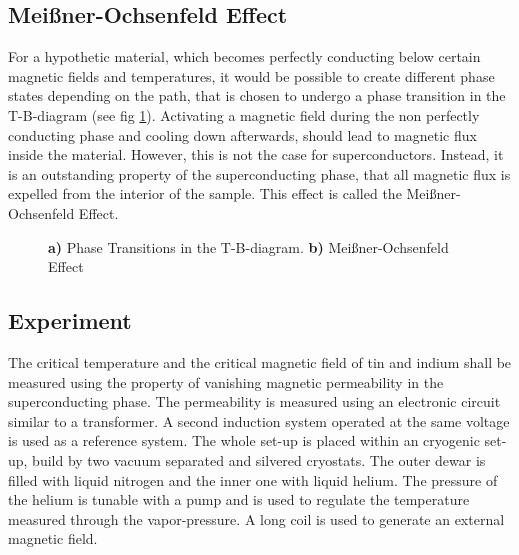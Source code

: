 \documentclass[a4paper]{scrartcl}
\numberwithin{equation}{section}
\numberwithin{figure}{section}
\numberwithin{table}{section}
\begin{document}
\subsection*{Meißner-Ochsenfeld Effect}
For a hypothetic material, which becomes perfectly conducting below certain magnetic fields and temperatures, it would be possible to create different phase states depending on the path, that is chosen to undergo a phase transition in the T-B-diagram (see fig \ref{fig:tb}). Activating a magnetic field during the non perfectly conducting phase and cooling down afterwards, should lead to magnetic flux inside the material. However, this is not the case for superconductors. Instead, it is an outstanding property of the superconducting phase, that all magnetic flux is expelled from the interior of the sample. This effect is called the Meißner-Ochsenfeld Effect.

\begin{figure}
\caption{\small \textbf{a)} Phase Transitions in the T-B-diagram. \textbf{b)} Meißner-Ochsenfeld Effect}
\label{fig:tb}
\end{figure}

\subsection*{Experiment} 
The critical temperature and the critical magnetic field of tin and indium shall be measured using the property of vanishing magnetic permeability in the superconducting phase. The permeability is measured using an electronic circuit similar to a transformer. A second induction system operated at the same voltage is used as a reference system. The whole set-up is placed within an cryogenic set-up, build by two vacuum separated and silvered cryostats. The outer dewar is filled with liquid nitrogen and the inner one with liquid helium. The pressure of the helium is tunable with a pump and is used to regulate the temperature measured through the vapor-pressure. A long coil is used to generate an external magnetic field.
\end{document}
